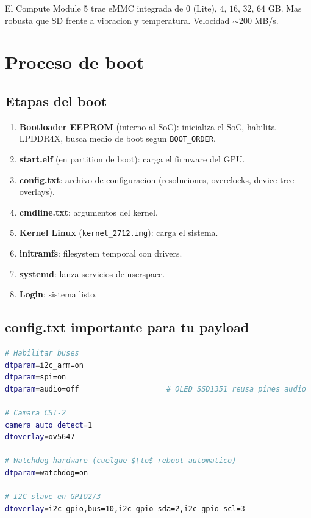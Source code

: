\documentclass[11pt,a4paper,oneside]{report}
\begin{document}
El Compute Module 5 trae eMMC integrada de $0$ (Lite), $4$, $16$, $32$, $64$ GB.
Mas robusta que SD frente a vibracion y temperatura. Velocidad $\sim 200$ MB/s.

\chapter{Proceso de boot}

\section{Etapas del boot}

\begin{enumerate}[leftmargin=2em]
  \item \textbf{Bootloader EEPROM} (interno al SoC): inicializa el SoC,
        habilita LPDDR4X, busca medio de boot segun \texttt{BOOT\_ORDER}.
  \item \textbf{start.elf} (en partition de boot): carga el firmware del GPU.
  \item \textbf{config.txt}: archivo de configuracion (resoluciones, overclocks,
        device tree overlays).
  \item \textbf{cmdline.txt}: argumentos del kernel.
  \item \textbf{Kernel Linux} (\texttt{kernel\_2712.img}): carga el sistema.
  \item \textbf{initramfs}: filesystem temporal con drivers.
  \item \textbf{systemd}: lanza servicios de userspace.
  \item \textbf{Login}: sistema listo.
\end{enumerate}

\section{config.txt importante para tu payload}

\begin{lstlisting}[language=bash]
# Habilitar buses
dtparam=i2c_arm=on
dtparam=spi=on
dtparam=audio=off                    # OLED SSD1351 reusa pines audio

# Camara CSI-2
camera_auto_detect=1
dtoverlay=ov5647

# Watchdog hardware (cuelgue $\to$ reboot automatico)
dtparam=watchdog=on

# I2C slave en GPIO2/3
dtoverlay=i2c-gpio,bus=10,i2c_gpio_sda=2,i2c_gpio_scl=3
\end{lstlisting}
\end{document}
